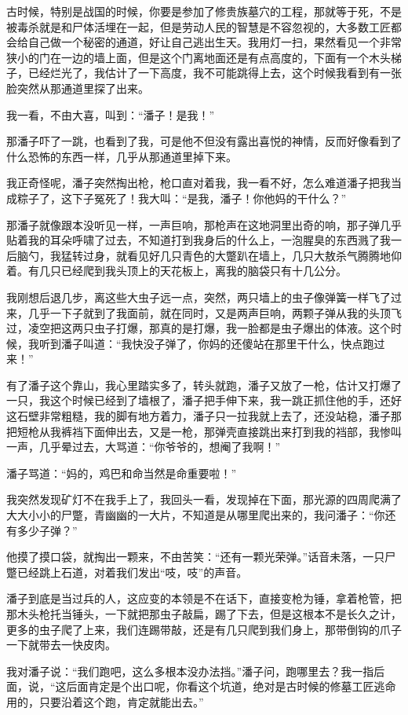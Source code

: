 古时候，特别是战国的时候，你要是参加了修贵族墓穴的工程，那就等于死，不是被毒杀就是和尸体活埋在一起，但是劳动人民的智慧是不容忽视的，大多数工匠都会给自己做一个秘密的通道，好让自己逃出生天。我用灯一扫，果然看见一个非常狭小的门在一边的墙上面，但是这个门离地面还是有点高度的，下面有一个木头梯子，已经烂光了，我估计了一下高度，我不可能跳得上去，这个时候我看到有一张脸突然从那通道里探了出来。

我一看，不由大喜，叫到：“潘子！是我！”

那潘子吓了一跳，也看到了我，可是他不但没有露出喜悦的神情，反而好像看到了什么恐怖的东西一样，几乎从那通道里掉下来。

我正奇怪呢，潘子突然掏出枪，枪口直对着我，我一看不好，怎么难道潘子把我当成粽子了，这下子冤死了！我大叫：“是我，潘子！你他妈的干什么？”

那潘子就像跟本没听见一样，一声巨响，那枪声在这地洞里出奇的响，那子弹几乎贴着我的耳朵呼啸了过去，不知道打到我身后的什么上，一泡腥臭的东西溅了我一后脑勺，我猛转过身，就看见好几只青色的大蹩趴在墙上，几只大敖杀气腾腾地仰着。有几只已经爬到我头顶上的天花板上，离我的脑袋只有十几公分。

我刚想后退几步，离这些大虫子远一点，突然，两只墙上的虫子像弹簧一样飞了过来，几乎一下子就到了我面前，就在同时，又是两声巨响，两颗子弹从我的头顶飞过，凌空把这两只虫子打爆，那真的是打爆，我一脸都是虫子爆出的体液。这个时候，我听到潘子叫道：“我快没子弹了，你妈的还傻站在那里干什么，快点跑过来！”

有了潘子这个靠山，我心里踏实多了，转头就跑，潘子又放了一枪，估计又打爆了一只，我这个时候已经到了墙根了，潘子把手伸下来，我一跳正抓住他的手，还好这石壁非常粗糙，我的脚有地方着力，潘子只一拉我就上去了，还没站稳，潘子那把短枪从我裤裆下面伸出去，又是一枪，那弹壳直接跳出来打到我的裆部，我惨叫一声，几乎晕过去，大骂道：“你爷爷的，想阉了我啊！”

潘子骂道：“妈的，鸡巴和命当然是命重要啦！”

我突然发现矿灯不在我手上了，我回头一看，发现掉在下面，那光源的四周爬满了大大小小的尸蹩，青幽幽的一大片，不知道是从哪里爬出来的，我问潘子：“你还有多少子弹？”

他摸了摸口袋，就掏出一颗来，不由苦笑：“还有一颗光荣弹。”话音未落，一只尸蹩已经跳上石道，对着我们发出“吱，吱”的声音。

潘子到底是当过兵的人，这应变的本领是不在话下，直接变枪为锤，拿着枪管，把那木头枪托当锤头，一下就把那虫子敲扁，踢了下去，但是这根本不是长久之计，更多的虫子爬了上来，我们连踢带敲，还是有几只爬到我们身上，那带倒钩的爪子一下就带去一快皮肉。

我对潘子说：“我们跑吧，这么多根本没办法挡。”潘子问，跑哪里去？我一指后面，说，“这后面肯定是个出口呢，你看这个坑道，绝对是古时候的修墓工匠逃命用的，只要沿着这个跑，肯定就能出去。”

